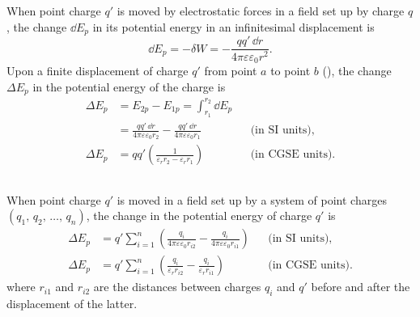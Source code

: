 \subsection{}\label{16.2.2} When point charge $q'$ is moved by electrostatic forces in a field set up by charge $q$, the change $\dd E_{p}$ in its potential energy in an infinitesimal displacement is
\begin{equation*}%
\dd E_{p} = -\delta W = - \frac{qq' \, \dd r}{4 \pi \varepsilon \varepsilon_{0} r^{2}}.
\end{equation*}
Upon a finite displacement of charge $q'$ from point $a$ to point $b$ (), the change $\Delta E_{p}$ in the potential energy of the charge
is
\begin{align*}%
\Delta E_{p} & = E_{2p} - E_{1p} = \int_{r_{1}}^{r_{2}} \dd E_{p} \\
& = \frac{qq' \, \dd r}{4 \pi \varepsilon \varepsilon_{0} r_{2}} - \frac{qq' \, \dd r}{4 \pi \varepsilon \varepsilon_{0} r_{1}} && \text{(in SI units),} \\
\Delta E_{p} & =  qq'\left( \frac{1}{\varepsilon_{r} r_{2} - \varepsilon_{r} r_{1}} \right) && \text{(in CGSE units).}
\end{align*}

\subsection{}\label{16.2.3} When point charge $q'$ is moved in a field set up by a system of point charges $(q_{1},\, q_{2},\, \ldots , \, q_{n})$, the change in the potential energy of charge $q'$ is
\begin{align*}%
\Delta E_{p} & =  q' \sum_{i = 1}^{n}\left( \frac{q_{i}}{4 \pi \varepsilon \varepsilon_{0} r_{i2}} - \frac{q_{i}}{4 \pi \varepsilon \varepsilon_{0} r_{i1}}\right) && \text{(in SI units)},\\
\Delta E_{p} & = q' \sum_{i = 1}^{n}\left( \frac{q_{i}}{\varepsilon_{r} r_{i2}} - \frac{q_{i}}{ \varepsilon_{r} r_{i1}}\right) && \text{(in CGSE units).}
\end{align*}
where $r_{i1}$ and $r_{i2}$ are the distances between charges $q_{i}$ and $q'$ before and after the displacement of the latter.

